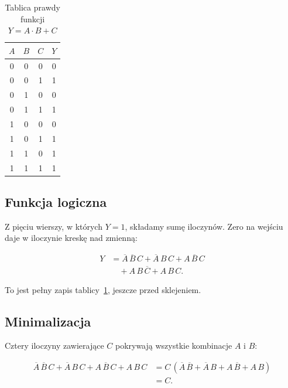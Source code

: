 \begin{table}[H]
    \centering
    \caption{Tablica prawdy funkcji $Y = A \cdot B + C$}
    \label{tab:z1-prawda}
    \begin{tabular}{|c|c|c|c|}
        \hline
        $A$ & $B$ & $C$ & $Y$ \\
        \hline
        0 & 0 & 0 & 0 \\
        \hline
        0 & 0 & 1 & 1 \\
        \hline
        0 & 1 & 0 & 0 \\
        \hline
        0 & 1 & 1 & 1 \\
        \hline
        1 & 0 & 0 & 0 \\
        \hline
        1 & 0 & 1 & 1 \\
        \hline
        1 & 1 & 0 & 1 \\
        \hline
        1 & 1 & 1 & 1 \\
        \hline
    \end{tabular}
\end{table}

\subsection{Funkcja logiczna}

Z pięciu wierszy, w których $Y = 1$, składamy sumę iloczynów. Zero na wejściu daje w iloczynie kreskę nad zmienną:

\begin{align*}
Y &= \overline{A}\,\overline{B}\,C + \overline{A}\,B\,C + A\,\overline{B}\,C \\
  &\quad + A\,B\,\overline{C} + A\,B\,C.
\end{align*}

To jest pełny zapis tablicy~\ref{tab:z1-prawda}, jeszcze przed sklejeniem.

\subsection{Minimalizacja}

Cztery iloczyny zawierające $C$ pokrywają wszystkie kombinacje $A$ i $B$:

\begin{align*}
\overline{A}\,\overline{B}\,C + \overline{A}\,B\,C + A\,\overline{B}\,C + A\,B\,C
  &= C\,(\overline{A}\,\overline{B} + \overline{A}\,B + A\,\overline{B} + A\,B) \\
  &= C.
\end{align*}

